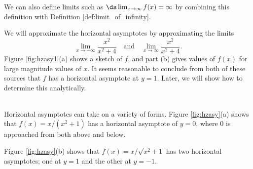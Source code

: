 We can also define limits such as $\ds\lim_{x\rightarrow\infty}f(x)=\infty$ by combining this definition with Definition \ref{def:limit_of_infinity}. \\ %

{}
{We will approximate the horizontal asymptotes by approximating the limits 
\[
\lim_{x\to-\infty} \frac{x^2}{x^2+4}\quad \text{and}\quad \lim_{x\to\infty} \frac{x^2}{x^2+4}.
\]
Figure \ref{fig:hzasy1}(a) shows a sketch of $f$, and part (b) gives values of $f(x)$ for large magnitude values of $x$. It seems reasonable to conclude from both of these sources that $f$ has a horizontal asymptote at $y=1$. Later, we will show how to determine this analytically.

}\\

Horizontal asymptotes can take on a variety of forms. Figure \ref{fig:hzasy}(a) shows that $f(x) = x/(x^2+1)$ has a horizontal asymptote of $y=0$, where 0 is approached from both above and below.


Figure \ref{fig:hzasy}(b) shows that $f(x) =x/\sqrt{x^2+1}$ has two horizontal asymptotes; one at $y=1$ and the other at $y=-1$.


